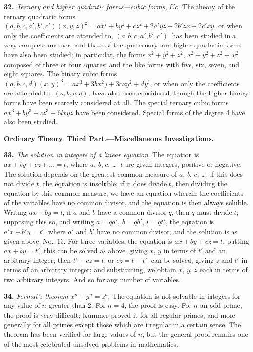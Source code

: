 \documentclass[11pt,a4paper]{book}
\begin{document}
\textbf{32.}\quad
\textit{Ternary and higher quadratic forms---cubic forms, \&c.} The theory of the ternary quadratic forms $(a, b, c, a', b', c')(x, y, z)^{2} = ax^{2} + by^{2} + cz^{2} + 2a'yz + 2b'zx + 2c'xy$, or when only the coefficients are attended to, $(a, b, c, a', b', c')$, has been studied in a very complete manner: and those of the quaternary and higher quadratic forms have also been studied; in particular, the forms $x^{2} + y^{2} + z^{2}$, $x^{2} + y^{2} + z^{2} + w^{2}$ composed of three or four squares; and the like forms with five, six, seven, and eight squares. The binary cubic forms $(a, b, c, d)(x, y)^{3} = ax^{3} + 3bx^{2}y + 3cxy^{2} + dy^{3}$, or when only the coefficients are attended to, $(a, b, c, d)$, have also been considered, though the higher binary forms have been scarcely considered at all. The special ternary cubic forms $ax^{3} + by^{3} + cz^{3} + 6lxyz$ have been considered. Special forms of the degree 4 have also been studied.

\bigskip
\noindent\textbf{Ordinary Theory, Third Part.---Miscellaneous Investigations.}

\smallskip

\textbf{33.}\quad
\textit{The solution in integers of a linear equation.} The equation is $ax + by + cz + \ldots = t$, where $a$, $b$, $c$, \ldots\ $t$ are given integers, positive or negative. The solution depends on the greatest common measure of $a$, $b$, $c$, \ldots: if this does not divide $t$, the equation is insoluble; if it does divide $t$, then dividing the equation by this common measure, we have an equation wherein the coefficients of the variables have no common divisor, and the equation is then always soluble. Writing $ax + by = t$, if $a$ and $b$ have a common divisor $q$, then $q$ must divide $t$; supposing this so, and writing $a = qa'$, $b = qb'$, $t = qt'$, the equation is $a'x + b'y = t'$, where $a'$ and $b'$ have no common divisor; and the solution is as given above, No.~13. For three variables, the equation is $ax + by + cz = t$; putting $ax + by = t'$, this can be solved as above, giving $x$, $y$ in terms of $t'$ and an arbitrary integer; then $t' + cz = t$, or $cz = t - t'$, can be solved, giving $z$ and $t'$ in terms of an arbitrary integer; and substituting, we obtain $x$, $y$, $z$ each in terms of two arbitrary integers. And so for any number of variables.

\textbf{34.}\quad
\textit{Fermat's theorem} $x^{n} + y^{n} = z^{n}$. The equation is not solvable in integers for any value of $n$ greater than 2. For $n = 4$, the proof is easy. For $n$ an odd prime, the proof is very difficult; Kummer proved it for all regular primes, and more generally for all primes except those which are irregular in a certain sense. The theorem has been verified for large values of $n$, but the general proof remains one of the most celebrated unsolved problems in mathematics.
\end{document}
